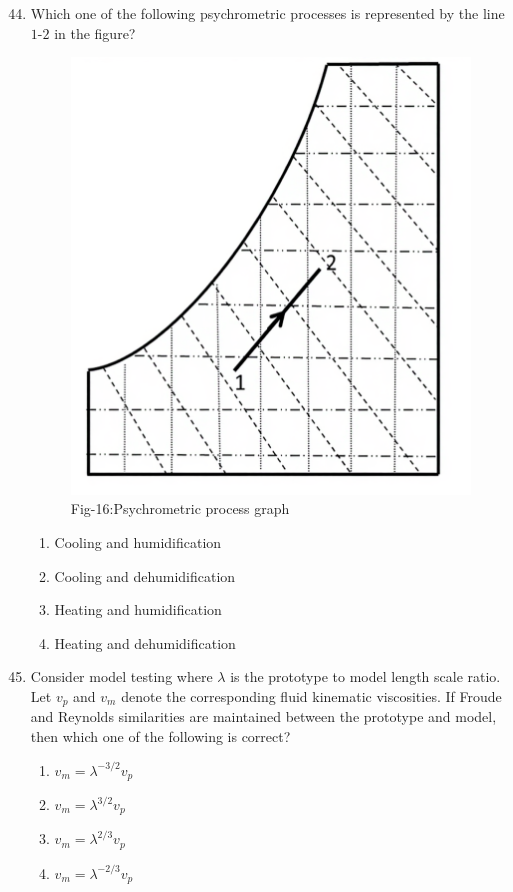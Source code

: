 \documentclass[journal]{IEEEtran}
\theoremstyle{remark}
\begin{document}
\begin{enumerate}[itemsep=1em]
\setcounter{enumi}{43}
\item Which one of the following psychrometric processes is represented by the line $1$-$2$ in the figure?
\begin{figure}[H]
    \centering
    \includegraphics[width=0.4\columnwidth]{figs/fig-16.png}
    \caption*{Fig-16:Psychrometric process graph}
    \label{fig-16}
\end{figure}

\begin{enumerate}[ leftmargin=2.5em, labelsep=0.5em, itemsep=0.5em]
     \item Cooling and humidification 
     \item Cooling and dehumidification
     \item Heating and humidification 
     \item Heating and dehumidification 
\end{enumerate}

\end{enumerate}

\begin{enumerate}[itemsep=1em]
\setcounter{enumi}{44}
\item Consider model testing where $\lambda$ is the prototype to model length scale ratio. Let $v_p$ and $v_m$ denote the corresponding fluid kinematic viscosities. If Froude and Reynolds similarities are maintained between the prototype and model, then which one of the following is correct? 

\begin{multicols}{4}
\begin{enumerate}
     \item $v_m=\lambda^{-3/2}v_p$
     \item $v_m=\lambda^{3/2}v_p$
     \item $v_m=\lambda^{2/3}v_p$
     \item $v_m=\lambda^{-2/3}v_p$
     
\end{enumerate}
\end{multicols}
\end{enumerate}
\end{document}
